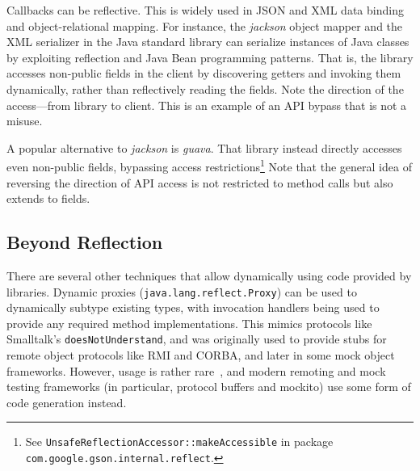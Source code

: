 

Callbacks can be reflective. This is widely used in JSON and XML data binding and object-relational mapping. For instance, the \textit{jackson} object mapper and the XML serializer in the Java standard library can serialize instances of Java classes by exploiting reflection and Java Bean programming patterns. That is, the library accesses non-public fields in the client by discovering getters and invoking them dynamically, rather than reflectively reading the fields. Note the direction of the access---from library to client. This is an example of an API bypass that is not a misuse.


A popular alternative to \textit{jackson} is \textit{guava}. That library instead directly accesses even non-public fields, bypassing access restrictions\footnote{See \texttt{UnsafeReflectionAccessor::makeAccessible} in package \texttt{com.google.gson.internal.reflect}.} Note that the general idea of reversing the direction of API access is not restricted to method calls but also extends to fields.

\subsection{Beyond Reflection}

There are several other techniques that allow dynamically using code provided by libraries. Dynamic proxies (\texttt{java.lang.reflect.Proxy}) can be used to dynamically subtype existing types, with invocation handlers being used to provide any required method implementations.  This mimics protocols like Smalltalk's \texttt{doesNotUnderstand}, and was originally used to provide stubs for remote object protocols like RMI and CORBA, and later in some mock object frameworks. However, usage is rather rare~\cite{dietrich2017xcorpus}, and modern remoting and mock testing frameworks (in particular, protocol buffers and mockito) use some form of code generation instead. 

